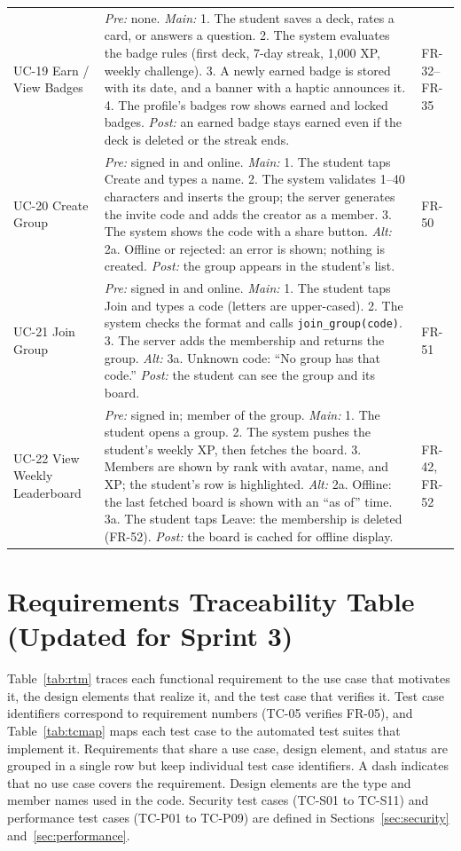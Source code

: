 \documentclass[12pt,letterpaper]{article}
\begin{document}
\begin{xltabular}{\textwidth}{@{}L{2.3cm} Y L{2.1cm}@{}}
UC-19 Earn / View Badges & \emph{Pre:} none. \emph{Main:} 1. The student saves a deck, rates a card, or answers a question. 2. The system evaluates the badge rules (first deck, 7-day streak, 1,000 XP, weekly challenge). 3. A newly earned badge is stored with its date, and a banner with a haptic announces it. 4. The profile's badges row shows earned and locked badges. \emph{Post:} an earned badge stays earned even if the deck is deleted or the streak ends. & FR-32--FR-35 \\
UC-20 Create Group & \emph{Pre:} signed in and online. \emph{Main:} 1. The student taps Create and types a name. 2. The system validates 1--40 characters and inserts the group; the server generates the invite code and adds the creator as a member. 3. The system shows the code with a share button. \emph{Alt:} 2a. Offline or rejected: an error is shown; nothing is created. \emph{Post:} the group appears in the student's list. & FR-50 \\
UC-21 Join Group & \emph{Pre:} signed in and online. \emph{Main:} 1. The student taps Join and types a code (letters are upper-cased). 2. The system checks the format and calls \texttt{join\_group(code)}. 3. The server adds the membership and returns the group. \emph{Alt:} 3a. Unknown code: ``No group has that code.'' \emph{Post:} the student can see the group and its board. & FR-51 \\
UC-22 View Weekly Leaderboard & \emph{Pre:} signed in; member of the group. \emph{Main:} 1. The student opens a group. 2. The system pushes the student's weekly XP, then fetches the board. 3. Members are shown by rank with avatar, name, and XP; the student's row is highlighted. \emph{Alt:} 2a. Offline: the last fetched board is shown with an ``as of'' time. 3a. The student taps Leave: the membership is deleted (FR-52). \emph{Post:} the board is cached for offline display. & FR-42, FR-52 \\
\end{xltabular}

\section{Requirements Traceability Table (Updated for Sprint 3)}\label{sec:trace}

Table~\ref{tab:rtm} traces each functional requirement to the use case that motivates
it, the design elements that realize it, and the test case that verifies it. Test case
identifiers correspond to requirement numbers (TC-05 verifies FR-05), and
Table~\ref{tab:tcmap} maps each test case to the automated test suites that implement
it. Requirements that share a use case, design element, and status are grouped in a
single row but keep individual test case identifiers. A dash indicates that no use case
covers the requirement. Design elements are the type and member names used in the code.
Security test cases (TC-S01 to TC-S11) and performance test cases (TC-P01 to TC-P09)
are defined in Sections~\ref{sec:security} and~\ref{sec:performance}.
\end{document}

